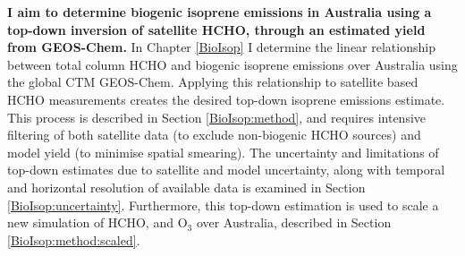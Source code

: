   \textbf{I aim to determine biogenic isoprene emissions in Australia using a top-down inversion of satellite HCHO, through an estimated yield from GEOS-Chem.}
  In Chapter \ref{BioIsop} I determine the linear relationship between total column HCHO and biogenic isoprene emissions over Australia using the global CTM GEOS-Chem.
  Applying this relationship to satellite based HCHO measurements creates the desired top-down isoprene emissions estimate.
  This process is described in Section \ref{BioIsop:method}, and requires intensive filtering of both satellite data (to exclude non-biogenic HCHO sources) and model yield (to minimise spatial smearing).
  The uncertainty and limitations of top-down estimates due to satellite and model uncertainty, along with temporal and horizontal resolution of available data is examined in Section \ref{BioIsop:uncertainty}.
  Furthermore, this top-down estimation is used to scale a new simulation of HCHO, and O$_3$ over Australia, described in Section \ref{BioIsop:method:scaled}.
   
